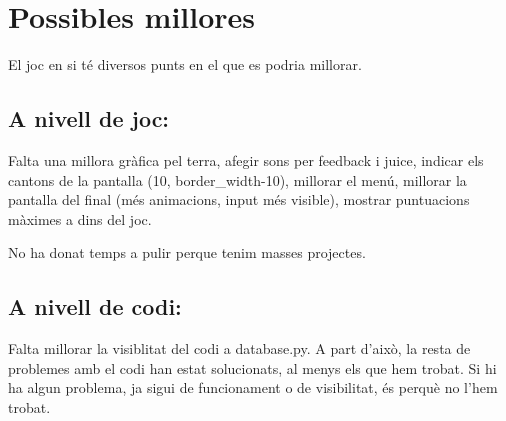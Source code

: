 \section{Possibles millores}

El joc en si t\'e diversos punts en el que es podria millorar.

\subsection{A nivell de joc:}

Falta una millora gr\`afica pel terra, afegir sons per feedback i juice,
indicar els cantons de la pantalla (10, border\_width-10), millorar el men\'u,
millorar la pantalla del final (m\'es animacions, input m\'es visible),
mostrar puntuacions m\`aximes a dins del joc.

No ha donat temps a pulir perque tenim masses projectes.


\subsection{A nivell de codi:}
Falta millorar la visiblitat del codi a database.py.
A part d'aix\`o, la resta de problemes amb el codi han estat solucionats,
al menys els que hem trobat. Si hi ha algun problema,
ja sigui de funcionament o de visibilitat, \'es perqu\`e no l'hem trobat.
